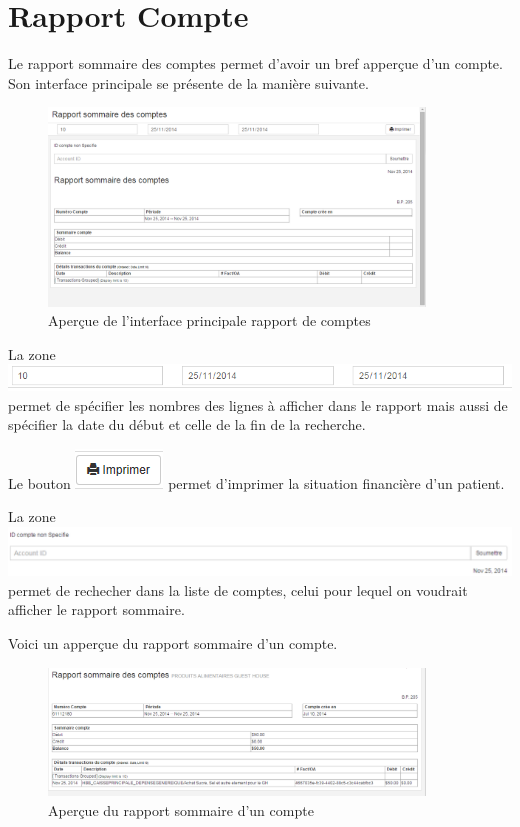 \documentclass[12pt,a4paper]{report}
\begin{document}
\newpage
\section{Rapport Compte}
Le rapport sommaire des comptes permet d'avoir un bref apperçue d'un compte. Son interface principale se présente de la manière suivante. 

\begin{figure}[h]
\begin{center}
\includegraphics[width=10cm]{pic/RapSomComptes.png}
\end{center}
\caption{Aperçue de l'interface principale rapport de comptes}
\label{Aperçue de l'interface principale rapport de comptes}
\end{figure}

La zone  \includegraphics[scale=0.7]{pic/LineAndDate.png} permet de spécifier les nombres des lignes à afficher dans le rapport mais aussi de spécifier la date du début et celle de la fin de la recherche. 

Le bouton \includegraphics[scale=0.7]{pic/Print.png} permet d'imprimer la situation financière d'un patient.

La zone  \includegraphics[scale=0.7]{pic/SelectedAccount.png} permet de rechecher dans la liste de comptes, celui pour lequel on voudrait afficher le rapport sommaire.


Voici un apperçue du rapport sommaire d'un compte.

\begin{figure}[h]
\begin{center}
\includegraphics[width=10cm]{pic/RapSomComptess.png}
\end{center}
\caption{Aperçue du rapport sommaire d'un compte}
\label{Aperçue du rapport sommaire d'un compte}
\end{figure}
\end{document}
